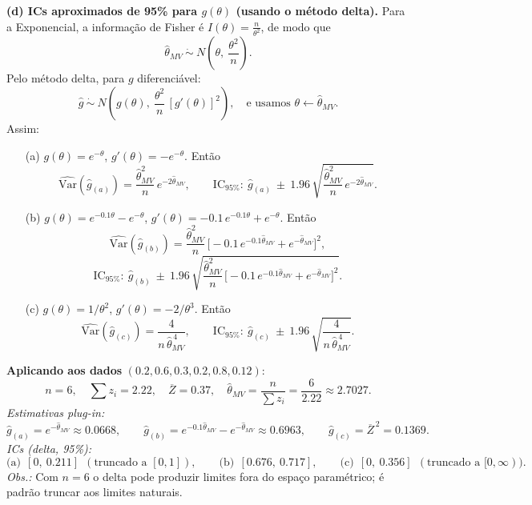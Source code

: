 \bigskip
\textbf{(d) ICs aproximados de 95\% para $g(\theta)$ (usando o método delta).}
Para a Exponencial, a informação de Fisher é $I(\theta)=\tfrac{n}{\theta^2}$,
de modo que
\[
\widehat\theta_{MV}\ \dot\sim\ N\!\left(\theta,\ \frac{\theta^2}{n}\right).
\]
Pelo método delta, para $g$ diferenciável:
\[
\widehat g\ \dot\sim\ N\!\left(g(\theta),\ \frac{\theta^2}{n}\,[g'(\theta)]^2\right),
\quad\text{e usamos } \theta\leftarrow\widehat\theta_{MV}.
\]
Assim:

\smallskip
\begin{itemize}
\item[(a)] $g(\theta)=e^{-\theta}$, $g'(\theta)=-e^{-\theta}$. Então
\[
\widehat{\mathrm{Var}}(\widehat g_{(a)})
=\frac{\widehat\theta_{MV}^2}{n}\,e^{-2\widehat\theta_{MV}},
\qquad
\text{IC}_{95\%}:\ \widehat g_{(a)}\ \pm\ 1.96\,
\sqrt{\frac{\widehat\theta_{MV}^2}{n}\,e^{-2\widehat\theta_{MV}}}.
\]
\item[(b)] $g(\theta)=e^{-0.1\theta}-e^{-\theta}$,
\(
g'(\theta)=-0.1\,e^{-0.1\theta}+e^{-\theta}.
\)
Então
\[
\widehat{\mathrm{Var}}(\widehat g_{(b)})
=\frac{\widehat\theta_{MV}^2}{n}\,\bigl[-0.1\,e^{-0.1\widehat\theta_{MV}}+e^{-\widehat\theta_{MV}}\bigr]^2,
\]
\[
\text{IC}_{95\%}:\ \widehat g_{(b)}\ \pm\ 1.96\,
\sqrt{\frac{\widehat\theta_{MV}^2}{n}\,\bigl[-0.1\,e^{-0.1\widehat\theta_{MV}}+e^{-\widehat\theta_{MV}}\bigr]^2}.
\]
\item[(c)] $g(\theta)=1/\theta^2$, $g'(\theta)=-2/\theta^3$. Então
\[
\widehat{\mathrm{Var}}(\widehat g_{(c)})
=\frac{4}{n\,\widehat\theta_{MV}^{\,4}},
\qquad
\text{IC}_{95\%}:\ \widehat g_{(c)}\ \pm\ 1.96\,\sqrt{\frac{4}{n\,\widehat\theta_{MV}^{\,4}}}.
\]
\end{itemize}

\medskip
\textbf{Aplicando aos dados} $(0.2,0.6,0.3,0.2,0.8,0.12)$:
\[
n=6,\quad \textstyle\sum z_i=2.22,\quad \overline Z=0.37,\quad
\widehat\theta_{MV}=\frac{n}{\sum z_i}=\frac{6}{2.22}\approx 2.7027.
\]
\emph{Estimativas plug-in:}
\[
\widehat g_{(a)}=e^{-\widehat\theta_{MV}}\approx 0.0668,\qquad
\widehat g_{(b)}=e^{-0.1\widehat\theta_{MV}}-e^{-\widehat\theta_{MV}}\approx 0.6963,\qquad
\widehat g_{(c)}=\overline Z^{\,2}=0.1369.
\]
\emph{ICs (delta, 95\%):}
\[
\text{(a)}\ \ [0,\ 0.211]\ \ (\text{truncado a }[0,1]),
\qquad
\text{(b)}\ \ [0.676,\ 0.717],
\qquad
\text{(c)}\ \ [0,\ 0.356]\ \ (\text{truncado a }[0,\infty)).
\]
\textit{Obs.:} Com $n=6$ o delta pode produzir limites fora do espaço paramétrico; é
padrão truncar aos limites naturais.

